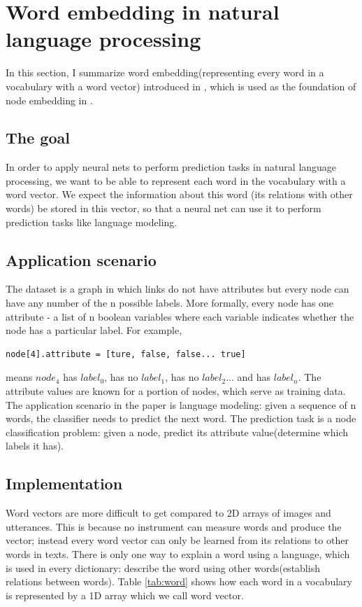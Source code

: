 \documentclass{article}
\begin{document}
\section{Word embedding in natural language processing}
In this section, I summarize word embedding(representing every word in a vocabulary with a word vector) introduced in \cite{mikolov2013efficient}, which is used as the foundation of node embedding in \cite{perozzi2014deepwalk}.

\subsection{The goal}

In order to apply neural nets to perform prediction tasks in natural language processing, we want to be able to represent each word in the vocabulary with a word vector. We expect the information about this word (its relations with other words) be stored in this vector, so that a neural net can use it to perform prediction tasks like language modeling.

\subsection{Application scenario}

The dataset is a graph in which links do not have attributes but every node can have any number of the n possible labels. More formally, every node has one attribute - a list of n boolean variables where each variable indicates whether the node has a particular label. For example,
\begin{lstlisting}
node[4].attribute = [ture, false, false... true]
\end{lstlisting}
means $ node_4 $ has $ label_0 $, has no $ label_1 $, has no $ label_2 $... and has $ label_n $. The attribute values are known for a portion of nodes, which serve as training data. The application scenario in the paper is language modeling: given a sequence of n words, the classifier needs to predict the next word. The prediction task is a node classification problem: given a node, predict its attribute value(determine which labels it has).

\subsection{Implementation}

Word vectors are more difficult to get compared to 2D arrays of images and utterances. This is because no instrument can measure words and produce the vector; instead every word vector can only be learned from its relations to other words in texts. There is only one way to explain a word using a language, which is used in every dictionary: describe the word using other words(establish relations between words). Table \ref{tab:word} shows how each word in a vocabulary is represented by a 1D array which we call word vector.
\end{document}
